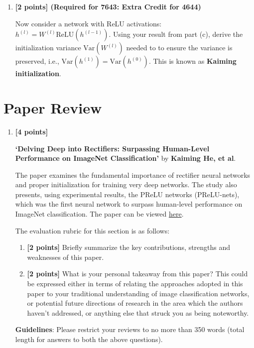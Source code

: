 \documentclass[11pt,english]{article}
\begin{document}
\begin{enumerate}[resume]
\begin{enumerate}[label=(\alph*)]
Modern networks use nonlinear activations. Before deriving the appropriate initialization for ReLU networks, we need a key identity. Let $x$ be a random variable with a symmetric distribution with zero mean. Prove that:
\[
\mathbb{E}[\text{ReLU}(x)^2] = \frac{1}{2}\mathbb{E}[x^2]
\]

\item \textbf{[2 points] (Required for 7643: Extra Credit for 4644)} 

Now consider a network with ReLU activations: $h^{(l)} = W^{(l)} \text{ReLU}(h^{(l-1)})$. Using your result from part (c), derive the initialization variance $\text{Var}(W^{(l)})$ needed to to ensure the variance is preserved, i.e., $\text{Var}(h^{(1)}) = \text{Var}(h^{(0)})$. This is known as \textbf{Kaiming initialization}.
\end{enumerate}

\end{enumerate}

\newpage
\section{Paper Review}
\begin{enumerate}[resume]

\item 
\textbf{[4 points]}

\textbf{`Delving Deep into Rectifiers: Surpassing Human-Level Performance on ImageNet Classification'} by \textbf{Kaiming He, et al}. 

The paper examines the fundamental importance of rectifier neural networks and proper initialization for training very deep networks. The study also presents, using experimental results, the PReLU networks (PReLU-nets), which was the first neural network to surpass human-level performance on ImageNet classification. The paper can be viewed \href{https://arxiv.org/abs/1502.01852}{here}.

The evaluation rubric for this section is as follows:

\begin{enumerate}[resume]
\item
\textbf{[2 points]}
Briefly summarize the key contributions, strengths and weaknesses of this paper.

\item
\textbf{[2 points]}
What is your personal takeaway from this paper? This could be expressed either in terms of relating the approaches adopted in this paper to your traditional understanding of image classification networks, or potential future directions of research in the area which the authors haven't addressed, or anything else that struck you as being noteworthy. 
\end{enumerate}

\textbf{Guidelines}: Please restrict your reviews to no more than 350 words (total length for answers to both the above questions).

\end{enumerate}
\end{document}
